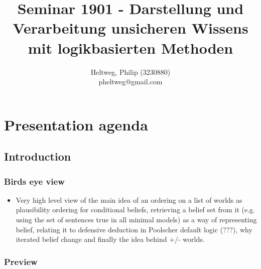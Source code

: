 \documentclass[11pt]{article}
\begin{document}
\title{Seminar 1901 - Darstellung und Verarbeitung unsicheren Wissens mit logikbasierten Methoden}
\author{
	Heltweg, Philip (3230880) \\
	pheltweg@gmail.com
}
\maketitle

\newpage

\tableofcontents

\newpage

\section{Presentation agenda}
\subsection{Introduction}
\subsubsection{Birds eye view}
\begin{itemize}
    \item Very high level view of the main idea of an ordering on a list of worlds as plausibility ordering for conditional beliefs, retrieving a belief set from it (e.g. using the set of sentences true in all minimal models) as a way of representing belief, relating it to defensive deduction in Poolscher default logic (???), why iterated belief change and finally the idea behind +/- worlds.
\end{itemize}
\subsubsection{Preview}
\end{document}
